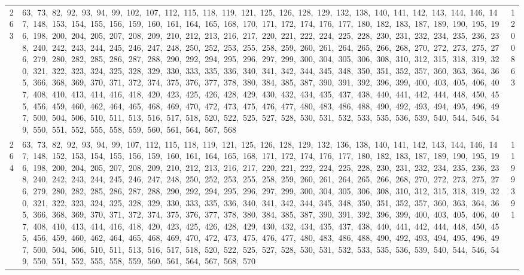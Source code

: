 \begin{longtable}{c|p{}|r}
263 & 63,\ 73,\ 82,\ 92,\ 93,\ 94,\ 99,\ 102,\ 107,\ 112,\ 115,\ 118,\ 119,\ 121,\ 125,\ 126,\ 128,\ 129,\ 132,\ 138,\ 140,\ 141,\ 142,\ 143,\ 144,\ 146,\ 147,\ 148,\ 153,\ 154,\ 155,\ 156,\ 159,\ 160,\ 161,\ 164,\ 165,\ 168,\ 170,\ 171,\ 172,\ 174,\ 176,\ 177,\ 180,\ 182,\ 183,\ 187,\ 189,\ 190,\ 195,\ 196,\ 198,\ 200,\ 204,\ 205,\ 207,\ 208,\ 209,\ 210,\ 212,\ 213,\ 216,\ 217,\ 220,\ 221,\ 222,\ 224,\ 225,\ 228,\ 230,\ 231,\ 232,\ 234,\ 235,\ 236,\ 238,\ 240,\ 242,\ 243,\ 244,\ 245,\ 246,\ 247,\ 248,\ 250,\ 252,\ 253,\ 255,\ 258,\ 259,\ 260,\ 261,\ 264,\ 265,\ 266,\ 268,\ 270,\ 272,\ 273,\ 275,\ 276,\ 279,\ 280,\ 282,\ 285,\ 286,\ 287,\ 288,\ 290,\ 292,\ 294,\ 295,\ 296,\ 297,\ 299,\ 300,\ 304,\ 305,\ 306,\ 308,\ 310,\ 312,\ 315,\ 318,\ 319,\ 320,\ 321,\ 322,\ 323,\ 324,\ 325,\ 328,\ 329,\ 330,\ 333,\ 335,\ 336,\ 340,\ 341,\ 342,\ 344,\ 345,\ 348,\ 350,\ 351,\ 352,\ 357,\ 360,\ 363,\ 364,\ 365,\ 366,\ 368,\ 369,\ 370,\ 371,\ 372,\ 374,\ 375,\ 376,\ 377,\ 378,\ 380,\ 384,\ 385,\ 387,\ 390,\ 391,\ 392,\ 396,\ 399,\ 400,\ 403,\ 405,\ 406,\ 407,\ 408,\ 410,\ 413,\ 414,\ 416,\ 418,\ 420,\ 423,\ 425,\ 426,\ 428,\ 429,\ 430,\ 432,\ 434,\ 435,\ 437,\ 438,\ 440,\ 441,\ 442,\ 444,\ 448,\ 450,\ 455,\ 456,\ 459,\ 460,\ 462,\ 464,\ 465,\ 468,\ 469,\ 470,\ 472,\ 473,\ 475,\ 476,\ 477,\ 480,\ 483,\ 486,\ 488,\ 490,\ 492,\ 493,\ 494,\ 495,\ 496,\ 497,\ 500,\ 504,\ 506,\ 510,\ 511,\ 513,\ 516,\ 517,\ 518,\ 520,\ 522,\ 525,\ 527,\ 528,\ 530,\ 531,\ 532,\ 533,\ 535,\ 536,\ 539,\ 540,\ 544,\ 546,\ 549,\ 550,\ 551,\ 552,\ 555,\ 558,\ 559,\ 560,\ 561,\ 564,\ 567,\ 568 & 1200863 \\
264 & 63,\ 73,\ 82,\ 92,\ 93,\ 94,\ 99,\ 107,\ 112,\ 115,\ 118,\ 119,\ 121,\ 125,\ 126,\ 128,\ 129,\ 132,\ 136,\ 138,\ 140,\ 141,\ 142,\ 143,\ 144,\ 146,\ 147,\ 148,\ 152,\ 153,\ 154,\ 155,\ 156,\ 159,\ 160,\ 161,\ 164,\ 165,\ 168,\ 171,\ 172,\ 174,\ 176,\ 177,\ 180,\ 182,\ 183,\ 187,\ 189,\ 190,\ 195,\ 196,\ 198,\ 200,\ 204,\ 205,\ 207,\ 208,\ 209,\ 210,\ 212,\ 213,\ 216,\ 217,\ 220,\ 221,\ 222,\ 224,\ 225,\ 228,\ 230,\ 231,\ 232,\ 234,\ 235,\ 236,\ 238,\ 240,\ 242,\ 243,\ 244,\ 245,\ 246,\ 247,\ 248,\ 250,\ 252,\ 253,\ 255,\ 258,\ 259,\ 260,\ 261,\ 264,\ 265,\ 266,\ 268,\ 270,\ 272,\ 273,\ 275,\ 276,\ 279,\ 280,\ 282,\ 285,\ 286,\ 287,\ 288,\ 290,\ 292,\ 294,\ 295,\ 296,\ 297,\ 299,\ 300,\ 304,\ 305,\ 306,\ 308,\ 310,\ 312,\ 315,\ 318,\ 319,\ 320,\ 321,\ 322,\ 323,\ 324,\ 325,\ 328,\ 329,\ 330,\ 333,\ 335,\ 336,\ 340,\ 341,\ 342,\ 344,\ 345,\ 348,\ 350,\ 351,\ 352,\ 357,\ 360,\ 363,\ 364,\ 365,\ 366,\ 368,\ 369,\ 370,\ 371,\ 372,\ 374,\ 375,\ 376,\ 377,\ 378,\ 380,\ 384,\ 385,\ 387,\ 390,\ 391,\ 392,\ 396,\ 399,\ 400,\ 403,\ 405,\ 406,\ 407,\ 408,\ 410,\ 413,\ 414,\ 416,\ 418,\ 420,\ 423,\ 425,\ 426,\ 428,\ 429,\ 430,\ 432,\ 434,\ 435,\ 437,\ 438,\ 440,\ 441,\ 442,\ 444,\ 448,\ 450,\ 455,\ 456,\ 459,\ 460,\ 462,\ 464,\ 465,\ 468,\ 469,\ 470,\ 472,\ 473,\ 475,\ 476,\ 477,\ 480,\ 483,\ 486,\ 488,\ 490,\ 492,\ 493,\ 494,\ 495,\ 496,\ 497,\ 500,\ 504,\ 506,\ 510,\ 511,\ 513,\ 516,\ 517,\ 518,\ 520,\ 522,\ 525,\ 527,\ 528,\ 530,\ 531,\ 532,\ 533,\ 535,\ 536,\ 539,\ 540,\ 544,\ 546,\ 549,\ 550,\ 551,\ 552,\ 555,\ 558,\ 559,\ 560,\ 561,\ 564,\ 567,\ 568,\ 570 & 1199391 \\

\end{longtable}
